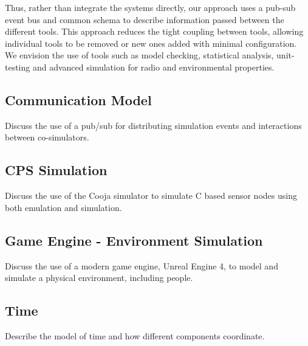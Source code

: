 Thus, rather than integrate the systems directly, our approach uses a pub-sub event bus and common schema to describe information passed between the different tools. This approach reduces the tight coupling between tools, allowing individual tools to be removed or new ones added with minimal configuration. We envision the use of tools such as model checking, statistical analysis, unit-testing and advanced simulation for radio and environmental properties.


\subsection{Communication Model} %
\label{sub:communication_model}

Discuss the use of a pub/sub for distributing simulation events and interactions between co-simulators.

\subsection{CPS Simulation} %
\label{sub:cps_simulation}
Discuss the use of the Cooja simulator to simulate C based sensor nodes using both emulation and simulation.

\subsection{Game Engine - Environment Simulation} %
\label{sub:environment_simulation}
Discuss the use of a modern game engine, Unreal Engine 4, to model and simulate a physical environment, including people.

\subsection{Time} %
\label{sub:time}
Describe the model of time and how different components coordinate.
